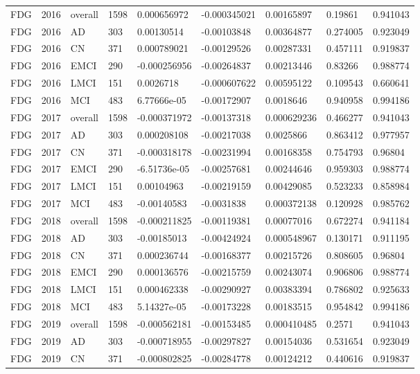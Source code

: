 \begin{landscape}
\begin{longtable}{lllllllll}
FDG & 2016 & overall & 1598 & 0.000656972 & -0.000345021 & 0.00165897 & 0.19861 & 0.941043 \\
FDG & 2016 & AD & 303 & 0.00130514 & -0.00103848 & 0.00364877 & 0.274005 & 0.923049 \\
FDG & 2016 & CN & 371 & 0.000789021 & -0.00129526 & 0.00287331 & 0.457111 & 0.919837 \\
FDG & 2016 & EMCI & 290 & -0.000256956 & -0.00264837 & 0.00213446 & 0.83266 & 0.988774 \\
FDG & 2016 & LMCI & 151 & 0.0026718 & -0.000607622 & 0.00595122 & 0.109543 & 0.660641 \\
FDG & 2016 & MCI & 483 & 6.77666e-05 & -0.00172907 & 0.0018646 & 0.940958 & 0.994186 \\
FDG & 2017 & overall & 1598 & -0.000371972 & -0.00137318 & 0.000629236 & 0.466277 & 0.941043 \\
FDG & 2017 & AD & 303 & 0.000208108 & -0.00217038 & 0.0025866 & 0.863412 & 0.977957 \\
FDG & 2017 & CN & 371 & -0.000318178 & -0.00231994 & 0.00168358 & 0.754793 & 0.96804 \\
FDG & 2017 & EMCI & 290 & -6.51736e-05 & -0.00257681 & 0.00244646 & 0.959303 & 0.988774 \\
FDG & 2017 & LMCI & 151 & 0.00104963 & -0.00219159 & 0.00429085 & 0.523233 & 0.858984 \\
FDG & 2017 & MCI & 483 & -0.00140583 & -0.0031838 & 0.000372138 & 0.120928 & 0.985762 \\
FDG & 2018 & overall & 1598 & -0.000211825 & -0.00119381 & 0.00077016 & 0.672274 & 0.941184 \\
FDG & 2018 & AD & 303 & -0.00185013 & -0.00424924 & 0.000548967 & 0.130171 & 0.911195 \\
FDG & 2018 & CN & 371 & 0.000236744 & -0.00168377 & 0.00215726 & 0.808605 & 0.96804 \\
FDG & 2018 & EMCI & 290 & 0.000136576 & -0.00215759 & 0.00243074 & 0.906806 & 0.988774 \\
FDG & 2018 & LMCI & 151 & 0.000462338 & -0.00290927 & 0.00383394 & 0.786802 & 0.925633 \\
FDG & 2018 & MCI & 483 & 5.14327e-05 & -0.00173228 & 0.00183515 & 0.954842 & 0.994186 \\
FDG & 2019 & overall & 1598 & -0.000562181 & -0.00153485 & 0.000410485 & 0.2571 & 0.941043 \\
FDG & 2019 & AD & 303 & -0.000718955 & -0.00297827 & 0.00154036 & 0.531654 & 0.923049 \\
FDG & 2019 & CN & 371 & -0.000802825 & -0.00284778 & 0.00124212 & 0.440616 & 0.919837 \\

\end{longtable}
\end{landscape}
